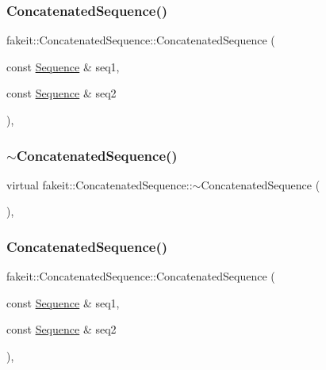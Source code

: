 \subsubsection{\texorpdfstring{ConcatenatedSequence()}{ConcatenatedSequence()}\hspace{0.1cm}{\footnotesize\ttfamily [4/9]}}
{\footnotesize\ttfamily fakeit\+::\+Concatenated\+Sequence\+::\+Concatenated\+Sequence (\begin{DoxyParamCaption}\item[{const \mbox{\hyperlink{classfakeit_1_1Sequence}{Sequence}} \&}]{seq1,  }\item[{const \mbox{\hyperlink{classfakeit_1_1Sequence}{Sequence}} \&}]{seq2 }\end{DoxyParamCaption})\hspace{0.3cm}{\ttfamily [inline]}, {\ttfamily [protected]}}

\mbox{\label{classfakeit_1_1ConcatenatedSequence_a22346ae8c3c2af91f26144338750be25}} 
\subsubsection{\texorpdfstring{$\sim$ConcatenatedSequence()}{~ConcatenatedSequence()}\hspace{0.1cm}{\footnotesize\ttfamily [4/9]}}
{\footnotesize\ttfamily virtual fakeit\+::\+Concatenated\+Sequence\+::$\sim$\+Concatenated\+Sequence (\begin{DoxyParamCaption}{ }\end{DoxyParamCaption})\hspace{0.3cm}{\ttfamily [inline]}, {\ttfamily [virtual]}}

\mbox{\label{classfakeit_1_1ConcatenatedSequence_abd7ca3783b69358f0ff4c15b970b01d0}} 
\subsubsection{\texorpdfstring{ConcatenatedSequence()}{ConcatenatedSequence()}\hspace{0.1cm}{\footnotesize\ttfamily [5/9]}}
{\footnotesize\ttfamily fakeit\+::\+Concatenated\+Sequence\+::\+Concatenated\+Sequence (\begin{DoxyParamCaption}\item[{const \mbox{\hyperlink{classfakeit_1_1Sequence}{Sequence}} \&}]{seq1,  }\item[{const \mbox{\hyperlink{classfakeit_1_1Sequence}{Sequence}} \&}]{seq2 }\end{DoxyParamCaption})\hspace{0.3cm}{\ttfamily [inline]}, {\ttfamily [protected]}}


